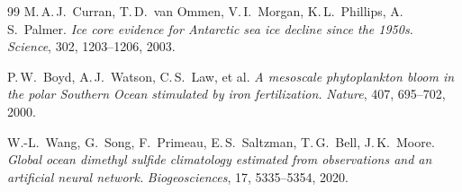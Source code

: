 ﻿\documentclass[a4paper,12pt]{article}
\theoremstyle{definition}
\begin{document}
\begin{thebibliography}{99}
M.\,A.\,J.~Curran, T.\,D.~van Ommen, V.\,I.~Morgan, K.\,L.~Phillips, A.\,S.~Palmer.
\textit{Ice core evidence for Antarctic sea ice decline since the 1950s.}
\textit{Science}, 302, 1203--1206, 2003.

P.\,W.~Boyd, A.\,J.~Watson, C.\,S.~Law, et al.
\textit{A mesoscale phytoplankton bloom in the polar Southern Ocean stimulated by iron
fertilization.}
\textit{Nature}, 407, 695--702, 2000.

W.-L.~Wang, G.~Song, F.~Primeau, E.\,S.~Saltzman, T.\,G.~Bell, J.\,K.~Moore.
\textit{Global ocean dimethyl sulfide climatology estimated from observations and an
artificial neural network.}
\textit{Biogeosciences}, 17, 5335--5354, 2020.

\end{thebibliography}
\end{document}
